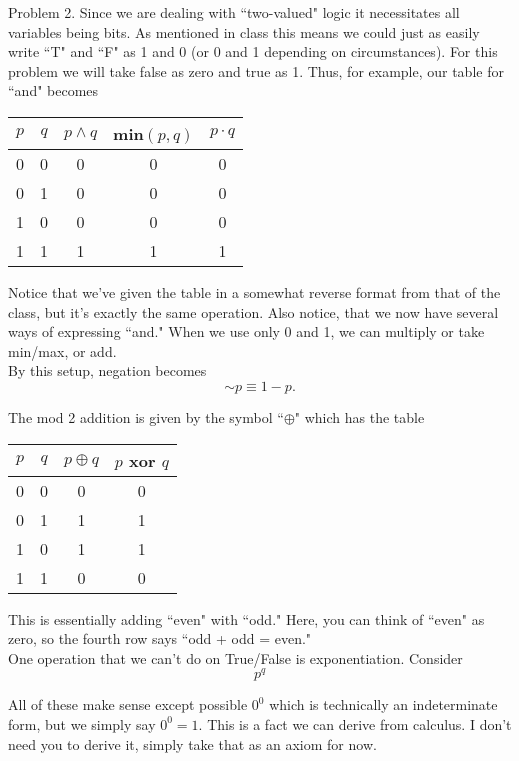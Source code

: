 \documentclass[16 pt]{amsart}
\theoremstyle{definition}
\theoremstyle{remark}
\numberwithin{equation}{subsection}
\begin{document}
\newpage


Problem 2. Since we are dealing with ``two-valued" logic it necessitates all variables being bits.  As mentioned in class this means we could just as easily write ``T" and ``F" as 1 and 0 (or 0 and 1 depending on circumstances).  For this problem we will take false as zero and true as 1.  Thus, for example, our table for ``and" becomes

\begin{center}
\begin{tabular}{c | c | c | c | c }
$p$ & $q$ & $p\wedge q$ & min$(p,q)$ & $p\cdot q$\\ 
\hline
0 & 0 & 0 & 0 & 0\\
0 & 1 & 0 & 0 & 0\\
1 & 0 & 0 & 0 & 0\\
1 & 1 & 1 & 1 & 1
\end{tabular}
\end{center}


Notice that we've given the table in a somewhat reverse format from that of the class, but it's exactly the same operation.  Also notice, that we now have several ways of expressing ``and." When we use only 0 and 1, we can multiply or take min/max, or add.\\

By this setup, negation becomes
\[
\sim p \equiv 1 - p.
\]

The mod 2 addition is given by the symbol ``$\oplus$" which has the table

\begin{center}
\begin{tabular}{c | c | c | c }
$p$ & $q$ & $p\oplus q$ & $p$ xor $q$\\ 
\hline
0 & 0 & 0 & 0 \\
0 & 1 & 1 & 1 \\
1 & 0 & 1 & 1 \\
1 & 1 & 0 & 0 
\end{tabular}
\end{center}

This is essentially adding ``even" with ``odd." Here, you can think of ``even" as zero, so the fourth row says ``odd + odd = even."\\

One operation that we can't do on True/False is exponentiation.  Consider
\[
p^q
\]

All of these make sense except possible $0^0$ which is technically an indeterminate form, but we simply say $0^0 = 1$.  This is a fact we can derive from calculus.  I don't need you to derive it, simply take that as an axiom for now.\\
\end{document}
